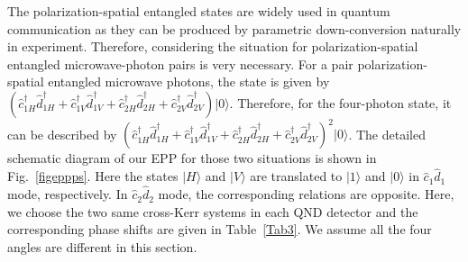 \documentclass[showpacs,aps,graphicx,twocolumn]{revtex4}
\begin{document}
The polarization-spatial entangled states are widely used in quantum
communication as they can be produced by parametric down-conversion
naturally in experiment. Therefore, considering the situation for
polarization-spatial entangled microwave-photon pairs is very
necessary. For a pair polarization-spatial entangled microwave
photons, the state is given by
$(\hat{c}_{1H}^{\dag}\hat{d}_{1H}^{\dag}+\hat{c}_{1V}^{\dag}\hat{d}_{1V}^{\dag}
+\hat{c}_{2H}^{\dag}\hat{d}_{2H}^{\dag}+\hat{c}_{2V}^{\dag}\hat{d}_{2V}^{\dag})|0\rangle$.
Therefore, for the four-photon state, it can be described by
$(\hat{c}_{1H}^{\dag}\hat{d}_{1H}^{\dag}+\hat{c}_{1V}^{\dag}\hat{d}_{1V}^{\dag}
+\hat{c}_{2H}^{\dag}\hat{d}_{2H}^{\dag}+\hat{c}_{2V}^{\dag}\hat{d}_{2V}^{\dag})^{2}|0\rangle$.
The detailed schematic diagram of our EPP for those two situations
is shown in Fig.~\ref{figeppps}. Here the states $|H\rangle$ and
$|V\rangle$ are translated to $|1\rangle$ and $|0\rangle$ in
$\hat{c}_{1}\hat{d}_{1}$ mode, respectively. In
$\hat{c}_{2}\hat{d}_{2}$ mode, the corresponding relations are
opposite. Here, we choose the two same cross-Kerr systems in each
QND detector and the corresponding phase shifts are given in
Table~\ref{Tab3}. We assume all the four angles are different in
this section.
\end{document}
